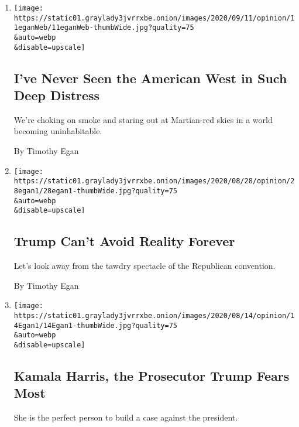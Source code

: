 \begin{enumerate}
\def\labelenumi{\arabic{enumi}.}
\item
  \href{/2020/09/11/opinion/fire-coronavirus-west-california.html}{}

  \texttt{[image: https://static01.graylady3jvrrxbe.onion/images/2020/09/11/opinion/11eganWeb/11eganWeb-thumbWide.jpg?quality=75\\\&auto=webp\\\&disable=upscale]}

  \hypertarget{ive-never-seen-the-american-west-in-such-deep-distress}{%
  \subsection{I've Never Seen the American West in Such Deep
  Distress}\label{ive-never-seen-the-american-west-in-such-deep-distress}}

  We're choking on smoke and staring out at Martian-red skies in a world
  becoming uninhabitable.

  By Timothy Egan
\item
  \href{/2020/08/28/opinion/trump-convention.html}{}

  \texttt{[image: https://static01.graylady3jvrrxbe.onion/images/2020/08/28/opinion/28egan1/28egan1-thumbWide.jpg?quality=75\\\&auto=webp\\\&disable=upscale]}

  \hypertarget{trump-cant-avoid-reality-forever}{%
  \subsection{Trump Can't Avoid Reality
  Forever}\label{trump-cant-avoid-reality-forever}}

  Let's look away from the tawdry spectacle of the Republican
  convention.

  By Timothy Egan
\item
  \href{/2020/08/14/opinion/kamala-harris-trump.html}{}

  \texttt{[image: https://static01.graylady3jvrrxbe.onion/images/2020/08/14/opinion/14Egan1/14Egan1-thumbWide.jpg?quality=75\\\&auto=webp\\\&disable=upscale]}

  \hypertarget{kamala-harris-the-prosecutor-trump-fears-most}{%
  \subsection{Kamala Harris, the Prosecutor Trump Fears
  Most}\label{kamala-harris-the-prosecutor-trump-fears-most}}

  She is the perfect person to build a case against the president.


\end{enumerate}
